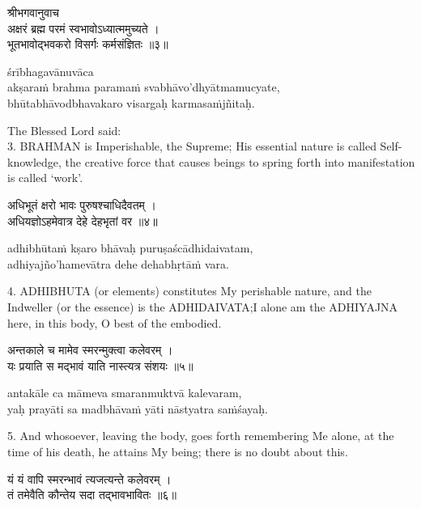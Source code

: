 \begin{gitaverse}
श्रीभगवानुवाच \\
अक्षरं ब्रह्म परमं स्वभावोऽध्यात्ममुच्यते । \\
भूतभावोद्भवकरो विसर्गः कर्मसंज्ञितः ॥३॥
\end{gitaverse}

\begin{transliteration}
śrībhagavānuvāca \\
akṣaraṁ brahma paramaṁ svabhāvo'dhyātmamucyate, \\
bhūtabhāvodbhavakaro visargaḥ karmasaṁjñitaḥ.
\end{transliteration}

The Blessed Lord said: \\
3. BRAHMAN is Imperishable, the Supreme; His essential nature is called
Self-knowledge, the creative force that causes beings to spring forth into
manifestation is called `work'.

\begin{gitaverse}
अधिभूतं क्षरो भावः पुरुषश्चाधिदैवतम् । \\
अधियज्ञोऽहमेवात्र देहे देहभृतां वर ॥४॥
\end{gitaverse}

\begin{transliteration}
adhibhūtaṁ kṣaro bhāvaḥ puruṣaścādhidaivatam, \\
adhiyajño'hamevātra dehe dehabhṛtāṁ vara.
\end{transliteration}

4. ADHIBHUTA (or elements) constitutes My perishable nature, and the Indweller
(or the essence) is the ADHIDAIVATA;\@ I alone am the ADHIYAJNA here, in this
body, O best of the embodied.

\begin{gitaverse}
अन्तकाले च मामेव स्मरन्मुक्त्वा कलेवरम् । \\
यः प्रयाति स मद्भावं याति नास्त्यत्र संशयः ॥५॥
\end{gitaverse}

\begin{transliteration}
antakāle ca māmeva smaranmuktvā kalevaram, \\
yaḥ prayāti sa madbhāvaṁ yāti nāstyatra saṁśayaḥ.
\end{transliteration}

5. And whosoever, leaving the body, goes forth remembering Me alone, at the
time of his death, he attains My being; there is no doubt about this.

\begin{gitaverse}
यं यं वापि स्मरन्भावं त्यजत्यन्ते कलेवरम् । \\
तं तमेवैति कौन्तेय सदा तद्भावभावितः ॥६॥
\end{gitaverse}

